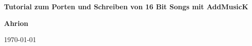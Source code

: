 \begin{titlepage}
    \begin{center}
        \vspace*{1cm}
            
        \Huge
        \textbf{Tutorial zum Porten und Schreiben von 16 Bit Songs mit AddMusicK}
            
        \vspace{0.5cm}
        \LARGE

            
        \vspace{1.5cm}
            
        \textbf{Ahrion}
        
        \vspace{1.5cm}
        
        \today
        
            

            
    \end{center}
\end{titlepage}